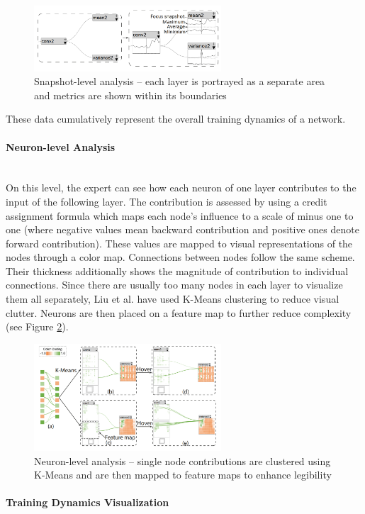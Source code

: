 \documentclass{acmsiggraph}               %
\newcommand{\paragraphbr}[1]{\paragraph{#1}\mbox{}\\}
\begin{document}
\begin{figure}[!htb]
  \centering
  \includegraphics[width=2.75in]{mengchen2}
  \caption{Snapshot-level analysis -- each layer is portrayed as a separate area and metrics are shown within its boundaries \protect\cite{Liu2018}}
  \label{fig:mengchen2}
\end{figure}

These data cumulatively represent the overall training dynamics of a network.

\paragraphbr{Neuron-level Analysis}

On this level, the expert can see how each neuron of one layer contributes to the input of the following layer. The contribution is assessed by using a credit assignment formula which maps each node's influence to a scale of minus one to one (where negative values mean backward contribution and positive ones denote forward contribution).
These values are mapped to visual representations of the nodes through a color map. Connections between nodes follow the same scheme. Their thickness additionally shows the magnitude of contribution to individual connections. Since there are usually too many nodes in each layer to visualize them all separately, Liu et al. have used K-Means clustering to reduce visual clutter. Neurons are then placed on a feature map to further reduce complexity (see Figure \ref{fig:mengchen3}).

\begin{figure}[!htb]
  \centering
  \includegraphics[width=2.75in]{mengchen3}
  \caption{Neuron-level analysis -- single node contributions are clustered using K-Means and are then mapped to feature maps to enhance legibility \protect\cite{Liu2018}}
  \label{fig:mengchen3}
\end{figure}

\paragraphbr{Training Dynamics Visualization}
\end{document}
